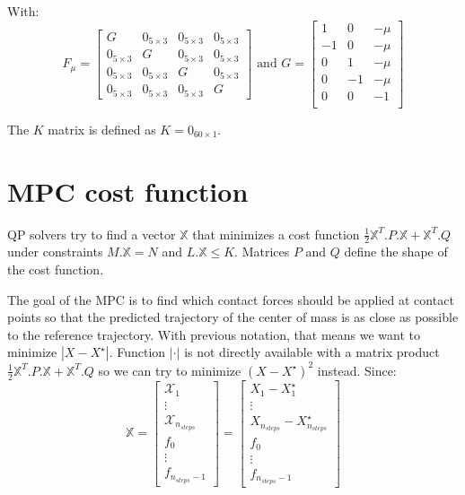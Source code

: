 \documentclass[a4paper,11pt]{article}
\begin{document}
With:
\begin{equation}
F_\mu = \begin{bmatrix} 
	G  & 0_{5\times3} & 0_{5\times3} & 0_{5\times3} \\
	0_{5\times3} & G & 0_{5\times3} & 0_{5\times3} \\
	0_{5\times3}  & 0_{5\times3} & G & 0_{5\times3} \\
	0_{5\times3}  & 0_{5\times3} & 0_{5\times3} & G
\end{bmatrix} \text{ and } G = \begin{bmatrix} 
1  & 0 & -\mu \\
-1 & 0 & -\mu \\
0  & 1 & -\mu \\
0  & -1 & -\mu \\
0  & 0 & - 1 \\
\end{bmatrix}
\end{equation}

The $K$ matrix is defined as $K = 0_{60 \times 1}$.

\section{MPC cost function}


QP solvers try to find a vector $\mathbb{X}$ that minimizes a cost function $\frac{1}{2}\mathbb{X}^T.P.\mathbb{X} + \mathbb{X}^T.Q$ under constraints $M.\mathbb{X} = N$ and $L.\mathbb{X} \leq K$. Matrices $P$ and $Q$ define the shape of the cost function.

The goal of the MPC is to find which contact forces should be applied at contact points so that the predicted trajectory of the center of mass is as close as possible to the reference trajectory. With previous notation, that means we want to minimize $|X - X^\star|$. Function $|\cdot|$ is not directly available with a matrix product $\frac{1}{2}\mathbb{X}^T.P.\mathbb{X} + \mathbb{X}^T.Q$ so we can try to minimize $(X - X^\star)^2$ instead. Since:
\begin{equation}
\mathbb{X} = \begin{bmatrix} \mathcal{X}_1 \\ \vdots \\ \mathcal{X}_{n_{steps}} \\ f_0 \\ \vdots \\ f_{n_{steps}-1} \end{bmatrix} = \begin{bmatrix} X_1 - X_1^\star \\ \vdots \\ X_{n_{steps}} - X_{n_{steps}}^\star\\ f_0 \\ \vdots \\ f_{n_{steps}-1} \end{bmatrix}
\end{equation}
\end{document}
